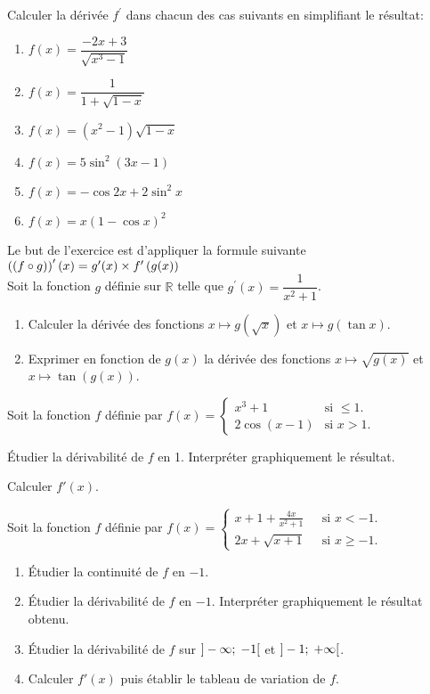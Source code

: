 \begin{exercice}
Calculer la dérivée $ f^{\prime} $  dans chacun des cas suivants en simplifiant le résultat:
\begin{enumerate}
\item  $ f(x)=\dfrac{-2x+3}{\sqrt{x^3-1}}$
\item  $ f(x)=\dfrac{1}{1+\sqrt{1-x}} $
\item  $ f(x)=(x^2-1)\sqrt{1-x} $
\item    $ f(x)=5\sin^2(3x-1) $
\item $ f(x)=-\cos 2x +2\sin^2 x$
\item   $ f(x)=x(1-\cos x)^2 $ 
\end{enumerate}
\end{exercice}
\begin{exercice}
Le but de l'exercice est d'appliquer la formule suivante\; $ \left( (f\circ g)\right)^{\prime}(x) = g^{\prime}(x)\times  f^{\prime}\left(g(x)\right)$\\
 Soit la fonction $ g $ définie sur $ \mathbb{R} $ telle  que $ g^{\prime}(x)=\dfrac{1}{x^2+1} $.
 \begin{enumerate}
\item  Calculer la dérivée des fonctions $x\longmapsto g\left( \sqrt{x}\right) $ \; et $ x\longmapsto g\left( \tan x\right) $.
\item Exprimer en fonction de $ g(x) $ la dérivée des fonctions $x\longmapsto  \sqrt{g(x)} $ \; et $x\longmapsto \tan\left(g(x) \right) $.
 \end{enumerate}
\end{exercice}
\begin{exercice}
Soit  la fonction $f$ définie par 
$
f(x)=\begin{cases} 
x^3+1\ \ \ & \text{si $\leq 1$.}\\
2\cos(x-1) & \text{si $x> 1$.}
\end{cases}
$

 Étudier  la dérivabilité de  $f$  en 1. Interpréter  graphiquement  le résultat.
 
 Calculer $ f'(x) $.
 \end{exercice}
\begin{exercice}
Soit  la fonction $f$ définie par 
$
f(x)=\begin{cases} 
x+1+\frac{4x}{x^2+1}\ \ \ & \text{si $x < -1$.}\\[0.25cm]
2x+\sqrt{x+1} & \text{si $x\geq -1$.}
\end{cases}
$
\begin{enumerate}
\item Étudier la continuité de  $f$  en $-1$.
\item Étudier la dérivabilité de  $f$  en $-1$. Interpréter  graphiquement  le résultat obtenu.
\item Étudier la dérivabilité de $ f $ sur $]-\infty; \;-1[ $ et $]-1; \; +\infty[ $.
\item Calculer $ f'(x) $  puis établir le tableau de variation  de $ f $.
\end{enumerate}
\end{exercice}
